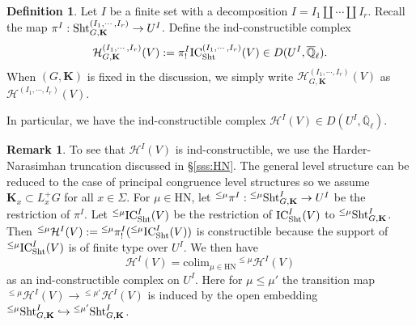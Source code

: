 \documentclass[11pt]{amsart}
\numberwithin{equation}{section}
\theoremstyle{plain}
\theoremstyle{definition}
\newtheorem{defn}[subsubsection]{Definition}
\newtheorem{remark}[subsubsection]{Remark}
\def\QQ{\mathbb{Q}}
\newcommand\cH{\mathcal{H}}
\def\bK{\mathbf{K}}
\newcommand\IC{\textup{IC}}
\newcommand\Sht{\textup{Sht}}
\newcommand{\incl}{\hookrightarrow}
\newcommand{\Qlbar}{\overline{\QQ}_\ell}
\newcommand{\Sig}{\Sigma}
\newcommand{\HN}{\mathrm{HN}}
\newcommand{\colim}{\mathrm{colim}}
\begin{document}
\begin{defn} Let $I$ be a finite set  with a decomposition $I=I_{1}\coprod\cdots \coprod I_{r}$. Recall the map $\pi^{I}: \Sht^{(I_{1},\cdots, I_{r})}_{G,\bK}\to U^{I}$.  Define the ind-constructible complex
\begin{equation*}
\cH^{(I_{1},\cdots, I_{r})}_{G,\bK}(V):=\pi^{I}_{!}\IC^{(I_{1},\cdots, I_{r})}_{\Sht}(V)\in D(U^{I}, \Qlbar).
\end{equation*}
When $(G,\bK)$ is fixed in the discussion, we simply write $\cH^{(I_{1},\cdots, I_{r})}_{G,\bK}(V)$ as $\cH^{(I_{1},\cdots, I_{r})}(V)$. 

In particular, we have the ind-constructible complex $\cH^{I}(V)\in D(U^{I}, \Qlbar)$. 
\end{defn}


\begin{remark}
To see that $\cH^{I}(V)$ is ind-constructible, we use the Harder-Narasimhan truncation discussed in \S\ref{sss:HN}. The general level structure can be reduced to the case of principal congruence level structures so we assume $\bK_{x}\subset L^{+}_{x}G$ for all $x\in \Sig$.   For $\mu\in \HN$, let ${}^{\le \mu}\pi^{I}: {}^{\le\mu}\Sht^{I}_{G,\bK}\to U^{I}$ be the restriction of $\pi^{I}$. Let ${}^{\le \mu}\IC_{\Sht}^{I}(V)$ be the restriction of $\IC^{I}_{\Sht}(V)$ to ${}^{\le\mu}\Sht^{I}_{G,\bK}$. Then ${}^{\le\mu}\cH^{I}(V):={}^{\le \mu}\pi^{I}_{!}({}^{\le \mu}\IC_{\Sht}^{I}(V))$ is constructible because the support of ${}^{\le \mu}\IC_{\Sht}^{I}(V)$ is of finite type over $U^{I}$. We then have
\begin{equation}\label{HV colim}
\cH^{I}(V)=\colim_{\mu\in \HN}{}^{\le\mu}\cH^{I}(V)
\end{equation}
as an ind-constructible complex on $U^{I}$. Here for $\mu\le \mu'$ the transition map ${}^{\le\mu}\cH^{I}(V)\to {}^{\le\mu'}\cH^{I}(V)$ is induced by the open embedding ${}^{\le\mu}\Sht^{I}_{G,\bK}\incl {}^{\le\mu'}\Sht^{I}_{G,\bK}$.  
\end{remark}
\end{document}
